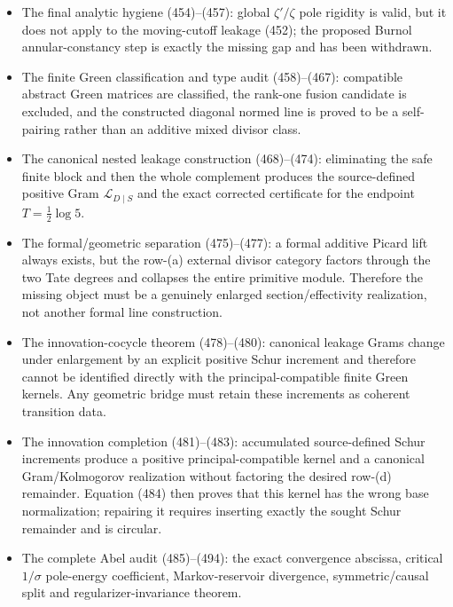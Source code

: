 \documentclass[11pt]{article}
\begin{document}
\begin{itemize}
      ordinary \(L^2\)-domain, ruling out a generic bounded-output synthesis.
      The only unproved arrow is now the explicitly isolated implication
      (700).
\item The final analytic hygiene (454)--(457): global
      $\zeta'/\zeta$ pole rigidity is valid, but it does not apply to the
      moving-cutoff leakage (452); the proposed Burnol annular-constancy
      step is exactly the missing gap and has been withdrawn.
\item The finite Green classification and type audit (458)--(467): compatible
      abstract Green matrices are classified, the rank-one fusion candidate
      is excluded, and the constructed diagonal normed line is proved to be
      a self-pairing rather than an additive mixed divisor class.
\item The canonical nested leakage construction (468)--(474): eliminating
      the safe finite block and then the whole complement produces the
      source-defined positive Gram $\mathscr L_{D\mid S}$ and the exact
      corrected certificate for the endpoint $T=\frac12\log5$.
\item The formal/geometric separation (475)--(477): a formal additive
      Picard lift always exists, but the row-(a) external divisor category
      factors through the two Tate degrees and collapses the entire primitive
      module.  Therefore the missing object must be a genuinely enlarged
      section/effectivity realization, not another formal line construction.
\item The innovation-cocycle theorem (478)--(480): canonical leakage Grams
      change under enlargement by an explicit positive Schur increment and
      therefore cannot be identified directly with the principal-compatible
      finite Green kernels.  Any geometric bridge must retain these
      increments as coherent transition data.
\item The innovation completion (481)--(483): accumulated source-defined
      Schur increments produce a positive principal-compatible kernel and a
      canonical Gram/Kolmogorov realization without factoring the desired
      row-(d) remainder.  Equation (484) then proves that this kernel has the
      wrong base normalization; repairing it requires inserting exactly the
      sought Schur remainder and is circular.
\item The complete Abel audit (485)--(494): the exact convergence abscissa,
      critical $1/\sigma$ pole-energy coefficient, Markov-reservoir
      divergence, symmetric/causal split and regularizer-invariance theorem.

\end{itemize}
\end{document}
